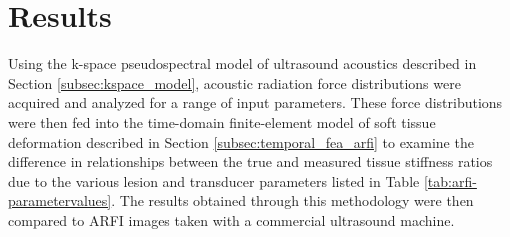 	\section{Results}
		Using the k-space pseudospectral model of ultrasound acoustics described in Section \ref{subsec:kspace_model}, acoustic radiation force distributions were acquired and analyzed for a range of input parameters. These force distributions were then fed into the time-domain finite-element model of soft tissue deformation described in Section \ref{subsec:temporal_fea_arfi} to examine the difference in relationships between the true and measured tissue stiffness ratios due to the various lesion and transducer parameters listed in Table \ref{tab:arfi-parametervalues}. The results obtained through this methodology were then compared to ARFI images taken with a commercial ultrasound machine. 

